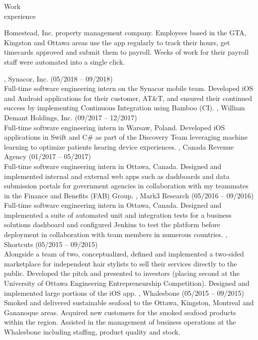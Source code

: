 \documentclass{resume}
\begin{document}
\begin{category}{Work \\experience}
\begin{itemize}
    Homestead, Inc. property management company. Employees based in the GTA, Kingston
    and Ottawa areas use the app regularly to track their hours, get timecards approved
    and submit them to payroll. Weeks of work for their payroll staff were automated into a
    single click.
  \end{itemize}
, Synacor, Inc. (05/2018 -- 09/2018)\\
Full-time software engineering intern on the Synacor mobile team.
Developed iOS and Android applications for their customer, AT\&T, and ensured
their continued success by implementing Continuous Integration using Bamboo (CI).
, William Demant Holdings, Inc. (09/2017 -- 12/2017)\\
Full-time software engineering intern in Warsaw, Poland.
Developed iOS applications in Swift and C\# as part of the Discovery Team leveraging machine
learning to optimize patients hearing device experiences.
, Canada Revenue Agency (01/2017 -- 05/2017)\\
Full-time software engineering intern in Ottawa, Canada. Designed and implemented internal
and external web apps such as dashboards and data submission portals for government agencies
in collaboration with my teammates in the Finance and Benefits (FAB) Group.
, Mark3 Research (05/2016 -- 09/2016)\\
Full-time software engineering intern in Ottawa, Canada. Designed and implemented a suite
of automated unit and integration tests for a business solutions dashboard and configured
Jenkins to test the platform before deployment in collaboration with team members in
numerous countries.
, Shortcuts (05/2015 -- 09/2015)\\
Alongside a team of two, conceptualized, defined and implemented a two-sided marketplace for
independent hair stylists to sell their services directly to the public. Developed
the pitch and presented to investors (placing second at the University of
Ottawa Engineering Entrepreneurship Competition).
Designed and implemented large portions of the iOS app.
, Whalesbone (05/2015 -- 09/2015)\\
Smoked and delivered sustainable seafood to the Ottawa, Kingston, Montreal
and Gananoque areas. Acquired new customers for the smoked seafood products within the region.
Assisted in the management of business operations at the Whalesbone including staffing,
product quality and stock.
\end{category}
\end{document}
